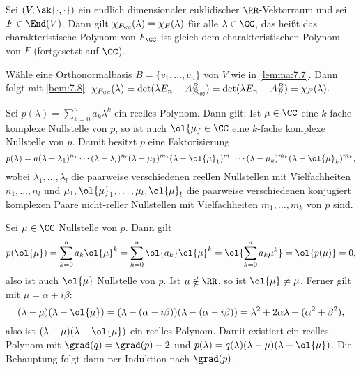 \begin{lemma}
	\label{lemma:7.9}
	Sei $(V,\sk{\cdot,\cdot})$ ein endlich dimensionaler euklidischer $\RR$-Vektorraum und sei $F \in \End(V)$.
	Dann gilt $\chi_{F_{\CC}}(\lambda) = \chi_F(\lambda)$ für alle $\lambda \in \CC$, das heißt das charakteristische Polynom von $F_{\CC}$ ist gleich dem charakteristischen Polynom von $F$ (fortgesetzt auf $\CC$).
\end{lemma}

\begin{beweis}
	Wähle eine Orthonormalbasis $B = \{v_1,\dots,v_n\}$ von $V$ wie in \autoref{lemma:7.7}.
	Dann folgt mit \autoref{bem:7.8}:
	$\chi_{F_{\CC}}(\lambda) = \det(\lambda E_n - A^B_{F_{\CC}}) = \det(\lambda E_n - A^B_F) = \chi_F(\lambda)$. 
\end{beweis}

\begin{lemma}
	\label{lemma:7.10}
	Sei $p(\lambda) = \sum_{k=0}^{n} a_k \lambda^k$ ein reelles Polynom.
	Dann gilt:
	Ist $\mu \in \CC$ eine $k$-fache komplexe Nullstelle von $p$, so ist auch $\ol{\mu} \in \CC$ eine $k$-fache komplexe Nullstelle von $p$.
	Damit besitzt $p$ eine Faktorisierung 
	\[
		p(\lambda) = a(\lambda-\lambda_1)^{n_1} \cdots (\lambda-\lambda_l)^{n_l}(\lambda-\mu_1)^{m_1} (\lambda-\ol{\mu}_1)^{m_1} \cdots (\lambda-\mu_k)^{m_k}(\lambda-\ol{\mu}_k)^{m_k},
	\]
	wobei $\lambda_1,\dots,\lambda_l$ die paarweise verschiedenen reellen Nullstellen mit Vielfachheiten $n_1,\dots,n_l$ und \linebreak $\mu_1,\ol{\mu}_1,\dots,\mu_l,\ol{\mu}_l$ die paarweise verschiedenen konjugiert komplexen Paare nicht-reller Nullstellen mit Vielfachheiten $m_1,\dots,m_k$ von $p$ sind.
\end{lemma}

\begin{beweis}
	Sei $\mu \in \CC$ Nullstelle von $p$.
	Dann gilt
	\[
		p(\ol{\mu}) = \sum_{k=0}^{n} a_k \ol{\mu}^k = \sum_{k=0}^{n} \ol{a_k} \ol{\mu}^k = \ol{\sum_{k=0}^{n} a_k \mu^k} = \ol{p(\mu)} = 0,
	\]
	also ist auch $\ol{\mu}$ Nullstelle von $p$.
	Ist $\mu \notin \RR$, so ist $\ol{\mu} \neq \mu$.
	Ferner gilt mit $\mu = \alpha + i \beta$:
	\[
		(\lambda-\mu)(\lambda-\ol{\mu}) = (\lambda - (\alpha-i\beta))(\lambda-(\alpha-i\beta)) = \lambda^2 + 2\alpha \lambda + (\alpha^2 + \beta^2),
	\]
	also ist $(\lambda-\mu)(\lambda-\ol{\mu})$ ein reelles Polynom.
	Damit existiert ein reelles Polynom mit $\grad(q) = \grad(p) - 2$ und $p(\lambda) = q(\lambda)(\lambda-\mu)(\lambda-\ol{\mu})$.
	Die Behauptung folgt dann per Induktion nach $\grad(p)$. 
\end{beweis}

